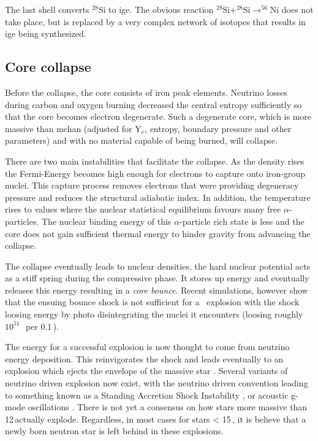 The last shell converts $^{28}$Si to \gls{ige}. The obvious reaction $^{28}\textrm{Si}+^{28}\textrm{Si}\rightarrow^{56}\textrm{Ni}$ does not take place, but is replaced by a very complex network of isotopes that results in \gls{ige} being synthesized.

\subsection{Core collapse} Before the collapse,  the core consists of iron peak elements. Neutrino losses during carbon and oxygen burning decreased the central entropy sufficiently so that the core becomes electron degenerate. Such a degenerate core, which is more massive than \gls{mchan} (adjusted for Y$_e$, entropy, boundary pressure and other parameters) and with no material capable of being burned, will collapse. 

There are two main instabilities that facilitate the collapse. As the density rises the Fermi-Energy becomes high enough for electrons to capture onto iron-group nuclei. This capture process removes electrons that were providing degeneracy pressure and reduces the structural adiabatic index. In addition, the temperature rises to values where the nuclear statistical equilibrium favours many free $\alpha$-particles. The nuclear binding energy of this  $\alpha$-particle rich state is less and the core does not gain sufficient thermal energy to hinder gravity from advancing the collapse.

The collapse eventually leads to nuclear densities, the hard nuclear potential acts as a stiff spring during the compressive phase. It stores up energy and eventually releases this energy resulting in a \textit{core bounce}.  Recent simulations, however show that the ensuing bounce shock is not sufficient for a \snii\ explosion with the shock loosing energy by photo disintegrating the nuclei it encounters (loosing roughly $10^{51}$\,\erg\ per 0.1\,\msun).

The energy for a successful explosion is now thought to come from neutrino energy deposition. This reinvigorates the shock and leads eventually to an explosion which ejects the envelope of the massive star \citep{1994ApJ...435..339H}. Several variants of neutrino driven explosion now exist, with the neutrino driven convention leading to something known as a Standing Accretion Shock Instability \citep[SASI;][]{2006ApJ...642..401B}, or acoustic g-mode oscillations \citep{2007ApJ...655..416B} . There is not yet a consensus on how stars more massive than 12\,\msun actually explode. Regardless, in most cases for stars < 15\,\msun, it is believe that a newly born neutron star is left behind in these explosions. 

